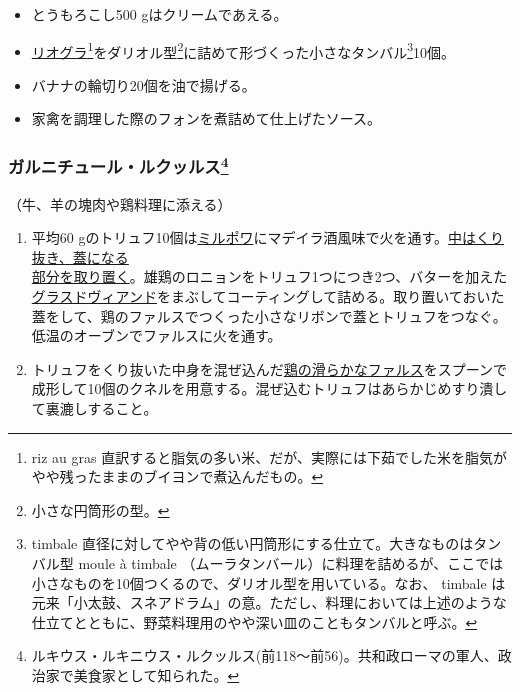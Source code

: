 \begin{recette}
\begin{itemize}
\item
  とうもろこし500 gはクリームであえる。
\item
  \protect\hyperlink{riz-au-gras}{リオグラ}\footnote{riz au gras
    直訳すると脂気の多い米、だが、実際には下茹でした米を脂気がやや残ったままのブイヨンで煮込んだもの。}をダリオル型\footnote{小さな円筒形の型。}に詰めて形づくった小さなタンバル\footnote{timbale
    直径に対してやや背の低い円筒形にする仕立て。大きなものはタンバル型
    moule à timbale
    （ムーラタンバール）に料理を詰めるが、ここでは小さなものを10個つくるので、ダリオル型を用いている。なお、
    timbale
    は元来「小太鼓、スネアドラム」の意。ただし、料理においては上述のような仕立てとともに、野菜料理用のやや深い皿のこともタンバルと呼ぶ。}10個。
\item
  バナナの輪切り20個を油で揚げる。
\item
  家禽を調理した際のフォンを煮詰めて仕上げたソース。
\end{itemize}

\hypertarget{garniture-lucullus}{%
\subsubsection[ガルニチュール・ルクッルス]{\texorpdfstring{ガルニチュール・ルクッルス\footnote{ルキウス・ルキニウス・ルクッルス(前118〜前56)。共和政ローマの軍人、政治家で美食家として知られた。}}{ガルニチュール・ルクッルス}}\label{garniture-lucullus}}



（牛、羊の塊肉や鶏料理に添える）

\begin{enumerate}
\def\labelenumi{\arabic{enumi}.}
\item
  平均60
  gのトリュフ10個は\protect\hyperlink{mirepoix}{ミルポワ}にマデイラ酒風味で火を通す。\ul{中はくり抜き、蓋になる\\部分を取り置く}。雄鶏のロニョンをトリュフ1つにつき2つ、バターを加えた\protect\hyperlink{glace-de-viande}{グラスドヴィアンド}をまぶしてコーティングして詰める。取り置いておいた蓋をして、鶏のファルスでつくった小さなリボンで蓋とトリュフをつなぐ。低温のオーブンでファルスに火を通す。
\item
  トリュフをくり抜いた中身を混ぜ込んだ\protect\hyperlink{farce-c}{鶏の滑らかなファルス}をスプーンで成形して10個のクネルを用意する。混ぜ込むトリュフはあらかじめすり潰して裏漉しすること。
\end{enumerate}


\end{recette}
